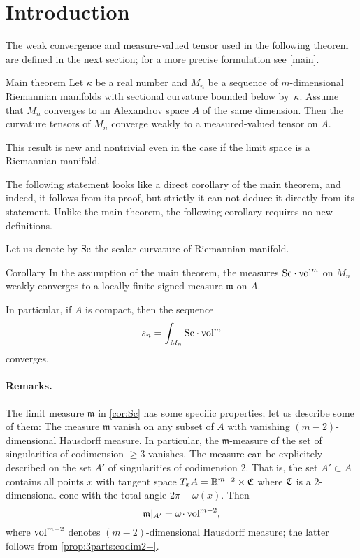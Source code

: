 \section{Introduction}

The weak convergence and measure-valued tensor used in the following theorem are defined in the next section;
for a more precise formulation see \ref{main}.

\begin{thm}{Main theorem}
Let $\kappa$ be a real number and 
$M_n$ be a sequence of $m$-dimensional Riemannian manifolds with sectional curvature bounded below by~$\kappa$.
Assume that $M_n$ converges to an Alexandrov space $A$ of the same dimension.
Then the curvature tensors of $M_n$ converge weakly to a measured-valued tensor on $A$.
\end{thm}

This result is new and nontrivial even in the case if the limit space is a Riemannian manifold.


The following statement looks like a direct corollary of the main theorem, 
and indeed, it follows from its proof, but strictly it can not deduce it directly from its statement.
Unlike the main theorem, the following corollary requires no new definitions.
 
Let us denote by $\operatorname{\rm Sc}$ the scalar curvature of Riemannian manifold.


\begin{thm}{Corollary}\label{cor:Sc}
In the assumption of the main theorem,
the measures $\Sc\cdot \vol^m$ on $M_n$ weakly converges to a locally finite signed measure $\mathfrak m$  on $A$.

In particular, if $A$ is compact, then the sequence
\[s_n=\int_{M_n}\Sc \cdot\vol^m\]
converges.
\end{thm}


\paragraph{Remarks.}
The limit measure $\mathfrak m$ in \ref{cor:Sc} has some specific properties;
let us describe some of them:
The measure $\mathfrak m$ vanish on any subset of $A$ with vanishing $(m-2)$-dimensional Hausdorff measure.
In particular, the $\mathfrak m$-measure of the set of singularities
of codimension $\ge 3$ vanishes.
The measure can be explicitely described 
on the set $A'$ of singularities
of codimension $2$. That is, the set $A'\subset A$
contains all points $x$ with tangent space
$T_xA=\mathbb{R}^{m-2}\times \mathfrak{C}$
where $\mathfrak{C}$ is a $2$-dimensional cone
with the total angle $2\pi-\omega(x)$.
Then 
$$\mathfrak m|_{A'}=\omega\cdot \vol^{m-2},$$
where $\operatorname{vol}^{m-2}$ denotes $(m-2)$-dimensional Hausdorff measure;
the latter follows from \ref{prop:3parts:codim2+}.



